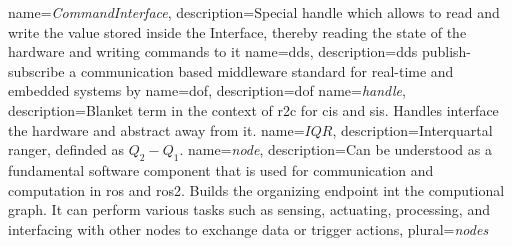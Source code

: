 \hyphenation{
}

\newcommand{\mybibliographyfiles}{Bibliography/ipr_articles,Bibliography/kit_template_example_bibliography,Bibliography/masterthesis}


{
    name={\textit{CommandInterface}},
    description={Special \gls{handle} which allows to read and write the value stored inside the Interface, thereby reading the state of the hardware and writing commands to it}
}
{
    name={\gls{dds}},
    description={\acrlong{dds} publish-subscribe a communication based middleware standard for real-time and embedded systems by \cite{pardo-castellote_omg_2003, schlesselman_omg_2004, noauthor_data_nodate}}
}
{
    name={\gls{dof}},
    description={\acrlong{dof}}
}
{
    name={\textit{handle}},
    description={Blanket term in the context of \gls{r2c} for \glspl{ci} and \glspl{si}. Handles interface the hardware and abstract away from it. }
}
{
    name={$IQR$},
    description={Interquartal ranger, definded as $Q_2-Q_1$.}
}
{
    name={\textit{node}},
    description={Can be understood as a fundamental software component that is used for communication and computation in \gls{ros} and \gls{ros2}. Builds the organizing endpoint int the computional graph. It can perform various tasks such as sensing, actuating, processing, and interfacing with other nodes to exchange data or trigger actions},
    plural={\textit{nodes}}
}
